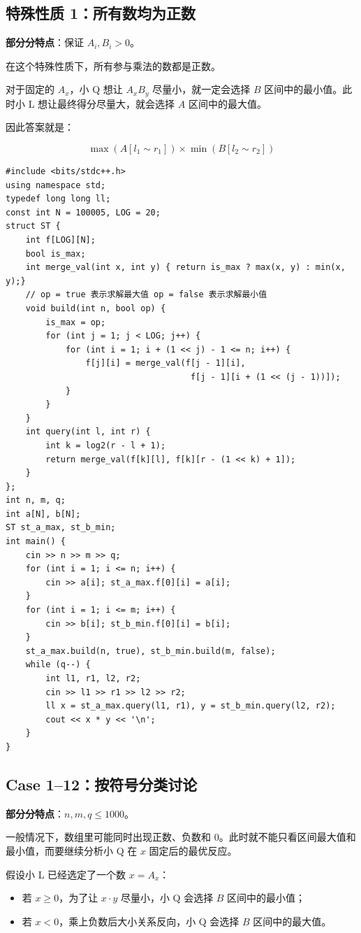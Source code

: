 \documentclass{book}
\begin{document}
\subsection{特殊性质 1：所有数均为正数}

\textbf{部分分特点}：保证 $A_i,B_i>0$。

在这个特殊性质下，所有参与乘法的数都是正数。

对于固定的 $A_x$，小 Q 想让 $A_xB_y$ 尽量小，就一定会选择 $B$ 区间中的最小值。此时小 L 想让最终得分尽量大，就会选择 $A$ 区间中的最大值。

因此答案就是：

$$
\max(A[l_1\sim r_1])\times \min(B[l_2\sim r_2])
$$
\begin{lstlisting}[style = code]
#include <bits/stdc++.h>
using namespace std;
typedef long long ll;
const int N = 100005, LOG = 20;
struct ST {
    int f[LOG][N];
    bool is_max;
    int merge_val(int x, int y) { return is_max ? max(x, y) : min(x, y);}
    // op = true 表示求解最大值 op = false 表示求解最小值
    void build(int n, bool op) {
        is_max = op;
        for (int j = 1; j < LOG; j++) {
            for (int i = 1; i + (1 << j) - 1 <= n; i++) {
                f[j][i] = merge_val(f[j - 1][i],
                                     f[j - 1][i + (1 << (j - 1))]);
            }
        }
    }
    int query(int l, int r) {
        int k = log2(r - l + 1);
        return merge_val(f[k][l], f[k][r - (1 << k) + 1]);
    }
};
int n, m, q;
int a[N], b[N];
ST st_a_max, st_b_min;
int main() {
    cin >> n >> m >> q;
    for (int i = 1; i <= n; i++) {
        cin >> a[i]; st_a_max.f[0][i] = a[i];
    }
    for (int i = 1; i <= m; i++) {
        cin >> b[i]; st_b_min.f[0][i] = b[i];
    }
    st_a_max.build(n, true), st_b_min.build(m, false);
    while (q--) {
        int l1, r1, l2, r2;
        cin >> l1 >> r1 >> l2 >> r2;
        ll x = st_a_max.query(l1, r1), y = st_b_min.query(l2, r2);
        cout << x * y << '\n';
    }
}
\end{lstlisting}

\subsection{Case 1--12：按符号分类讨论}

\textbf{部分分特点}：$n,m,q\le 1000$。

一般情况下，数组里可能同时出现正数、负数和 $0$。此时就不能只看区间最大值和最小值，而要继续分析小 Q 在 $x$ 固定后的最优反应。

假设小 L 已经选定了一个数 $x=A_x$：
\begin{itemize}[leftmargin=2em,itemsep=1pt,topsep=2pt,parsep=0pt,partopsep=0pt]
    \item 若 $x\ge 0$，为了让 $x\cdot y$ 尽量小，小 Q 会选择 $B$ 区间中的最小值；
    \item 若 $x<0$，乘上负数后大小关系反向，小 Q 会选择 $B$ 区间中的最大值。
\end{itemize}
\end{document}
